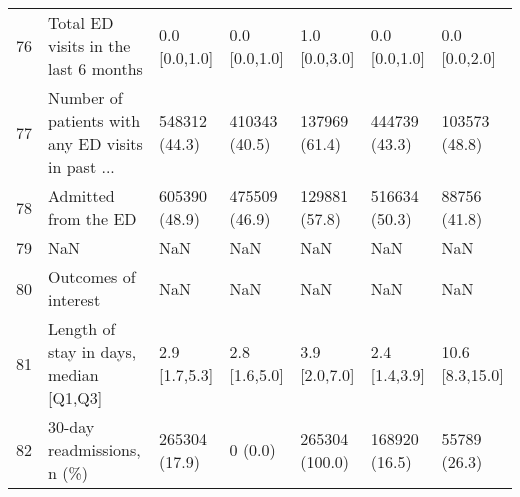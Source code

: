 \begin{tabular}{lllllll}
76 &               Total ED visits in the last 6 months &      0.0 [0.0,1.0] &                 0.0 [0.0,1.0] &             1.0 [0.0,3.0] &                  0.0 [0.0,1.0] &             0.0 [0.0,2.0] \\
77 &  Number of patients with any ED visits in past ... &      548312 (44.3) &                 410343 (40.5) &             137969 (61.4) &                  444739 (43.3) &             103573 (48.8) \\
78 &                               Admitted from the ED &      605390 (48.9) &                 475509 (46.9) &             129881 (57.8) &                  516634 (50.3) &              88756 (41.8) \\
79 &                                                NaN &                NaN &                           NaN &                       NaN &                            NaN &                       NaN \\
80 &                               Outcomes of interest &                NaN &                           NaN &                       NaN &                            NaN &                       NaN \\
81 &             Length of stay in days, median [Q1,Q3] &      2.9 [1.7,5.3] &                 2.8 [1.6,5.0] &             3.9 [2.0,7.0] &                  2.4 [1.4,3.9] &           10.6 [8.3,15.0] \\
82 &                         30-day readmissions, n (\%) &      265304 (17.9) &                       0 (0.0) &            265304 (100.0) &                  168920 (16.5) &              55789 (26.3) \\
\bottomrule
\end{tabular}
